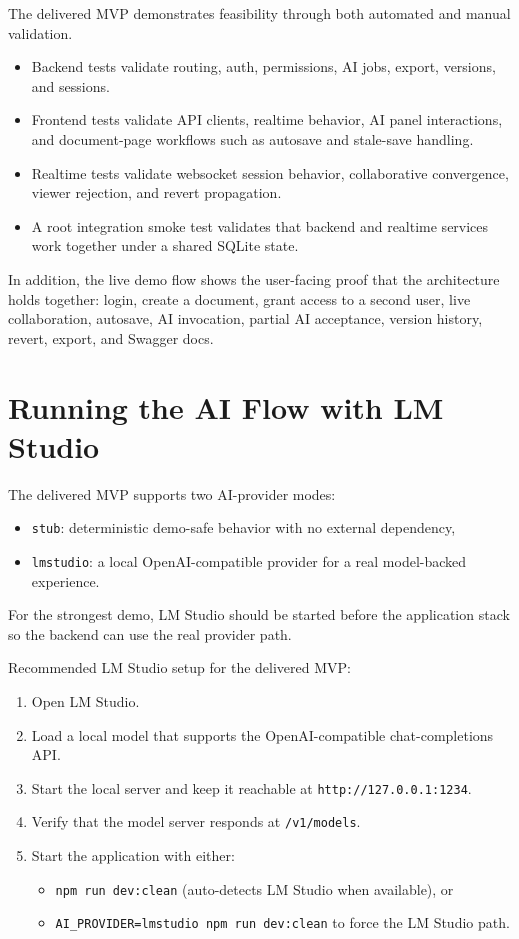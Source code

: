 The delivered MVP demonstrates feasibility through both automated and manual validation.

\begin{itemize}
  \item Backend tests validate routing, auth, permissions, AI jobs, export, versions, and sessions.
  \item Frontend tests validate API clients, realtime behavior, AI panel interactions, and document-page
  workflows such as autosave and stale-save handling.
  \item Realtime tests validate websocket session behavior, collaborative convergence, viewer rejection,
  and revert propagation.
  \item A root integration smoke test validates that backend and realtime services work together under a
  shared SQLite state.
\end{itemize}

In addition, the live demo flow shows the user-facing proof that the architecture holds together:
login, create a document, grant access to a second user, live collaboration, autosave, AI invocation,
partial AI acceptance, version history, revert, export, and Swagger docs.

\section{Running the AI Flow with LM Studio}

The delivered MVP supports two AI-provider modes:

\begin{itemize}
  \item \texttt{stub}: deterministic demo-safe behavior with no external dependency,
  \item \texttt{lmstudio}: a local OpenAI-compatible provider for a real model-backed experience.
\end{itemize}

For the strongest demo, LM Studio should be started before the application stack so the backend can use
the real provider path.

Recommended LM Studio setup for the delivered MVP:

\begin{enumerate}
  \item Open LM Studio.
  \item Load a local model that supports the OpenAI-compatible chat-completions API.
  \item Start the local server and keep it reachable at \texttt{http://127.0.0.1:1234}.
  \item Verify that the model server responds at \texttt{/v1/models}.
  \item Start the application with either:
  \begin{itemize}
    \item \texttt{npm run dev:clean} (auto-detects LM Studio when available), or
    \item \texttt{AI\_PROVIDER=lmstudio npm run dev:clean} to force the LM Studio path.
  \end{itemize}
\end{enumerate}

